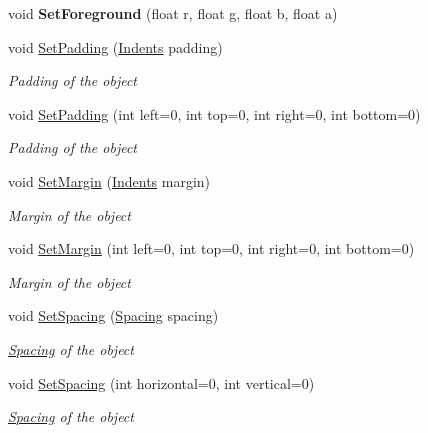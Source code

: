 \begin{DoxyCompactItemize}
void {\bfseries Set\+Foreground} (float r, float g, float b, float a)
\item 
void \mbox{\hyperlink{class_space_v_i_l_1_1_decorations_1_1_style_a7cbc0aea1575dd933c3280fcc2d095c3}{Set\+Padding}} (\mbox{\hyperlink{struct_space_v_i_l_1_1_decorations_1_1_indents}{Indents}} padding)
\begin{DoxyCompactList}\small\item\em Padding of the object \end{DoxyCompactList}\item 
void \mbox{\hyperlink{class_space_v_i_l_1_1_decorations_1_1_style_a1f422295a6035764e651a1270792b093}{Set\+Padding}} (int left=0, int top=0, int right=0, int bottom=0)
\begin{DoxyCompactList}\small\item\em Padding of the object \end{DoxyCompactList}\item 
void \mbox{\hyperlink{class_space_v_i_l_1_1_decorations_1_1_style_a092b6bb40ae310b4f86452a0737a5091}{Set\+Margin}} (\mbox{\hyperlink{struct_space_v_i_l_1_1_decorations_1_1_indents}{Indents}} margin)
\begin{DoxyCompactList}\small\item\em Margin of the object \end{DoxyCompactList}\item 
void \mbox{\hyperlink{class_space_v_i_l_1_1_decorations_1_1_style_a4fb9ab417f18c71d9b1aa6f103717706}{Set\+Margin}} (int left=0, int top=0, int right=0, int bottom=0)
\begin{DoxyCompactList}\small\item\em Margin of the object \end{DoxyCompactList}\item 
void \mbox{\hyperlink{class_space_v_i_l_1_1_decorations_1_1_style_a70094513dd035ea149fc0699a5a3819a}{Set\+Spacing}} (\mbox{\hyperlink{struct_space_v_i_l_1_1_decorations_1_1_spacing}{Spacing}} spacing)
\begin{DoxyCompactList}\small\item\em \mbox{\hyperlink{struct_space_v_i_l_1_1_decorations_1_1_spacing}{Spacing}} of the object \end{DoxyCompactList}\item 
void \mbox{\hyperlink{class_space_v_i_l_1_1_decorations_1_1_style_a07b5e0cd117311407ef6a43c351b82cb}{Set\+Spacing}} (int horizontal=0, int vertical=0)
\begin{DoxyCompactList}\small\item\em \mbox{\hyperlink{struct_space_v_i_l_1_1_decorations_1_1_spacing}{Spacing}} of the object \end{DoxyCompactList}\item 

\end{DoxyCompactItemize}
